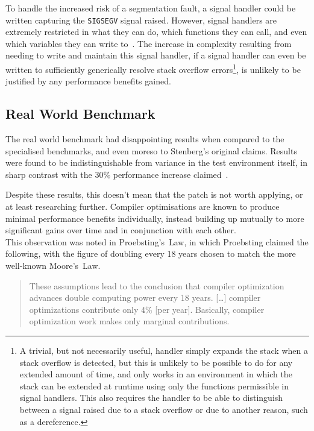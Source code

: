 To handle the increased risk of a segmentation fault, a signal handler could be written capturing the \texttt{SIGSEGV} signal raised. However, signal handlers are extremely restricted in what they can do, which functions they can call, and even which variables they can write to~\cite{signalhandling}. The increase in complexity resulting from needing to write and maintain this signal handler, if a signal handler can even be written to sufficiently generically resolve stack overflow errors\footnote{A trivial, but not necessarily useful, handler simply expands the stack when a stack overflow is detected, but this is unlikely to be possible to do for any extended amount of time, and only works in an environment in which the stack can be extended at runtime using only the functions permissible in signal handlers. This also requires the handler to be able to distinguish between a signal raised due to a stack overflow or due to another reason, such as a  dereference.}, is unlikely to be justified by any performance benefits gained.

\subsection{Real World Benchmark}

The real world benchmark had disappointing results when compared to the specialised benchmarks, and even moreso to Stenberg's original claims. Results were found to be indistinguishable from variance in the test environment itself, in sharp contrast with the 30\% performance increase claimed~\cite{curlmalloc}.

Despite these results, this doesn't mean that the patch is not worth applying, or at least researching further. Compiler optimisations are known to produce minimal performance benefits individually, instead building up mutually to more significant gains over time and in conjunction with each other.\\
This observation was noted in Proebsting's~Law, in which Proebsting claimed the following, with the figure of doubling every 18 years chosen to match the more well-known Moore's~Law.

\begin{quote}
	These assumptions lead to the conclusion that compiler optimization advances double computing power every 18 years. […] compiler optimizations contribute only 4\% [per year]. Basically, compiler optimization work makes only marginal contributions.~\cite{proebstingdecl}
\end{quote}

